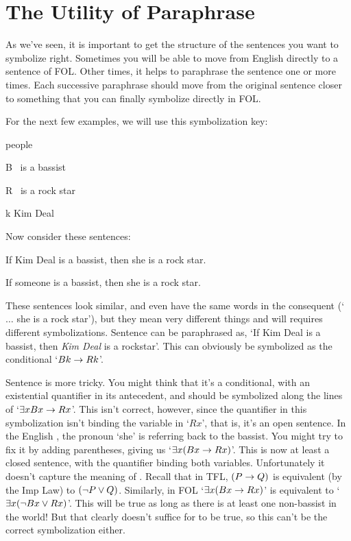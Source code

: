 \section{The Utility of Paraphrase}

As we've seen, it is important to get the structure of the sentences you want to symbolize right. Sometimes you will be able to move from English directly to a sentence of FOL. Other times, it helps to paraphrase the sentence one or more times. Each successive paraphrase should move from the original sentence closer to something that you can finally symbolize directly in FOL.

For the next few examples, we will use this symbolization key:
	\begin{ekey}
		\item[\text{domain}] people
		\item[B] \blank\ is a bassist
		\item[R] \blank\ is a rock star
		\item[k] Kim Deal
	\end{ekey}
Now consider these sentences:
	\begin{earg}
		\item[\ex{pronoun1}] If Kim Deal is a bassist, then she is a rock star.
		\item[\ex{pronoun2}] If someone is a bassist, then she is a rock star.
	\end{earg}
These sentences look similar, and even have the same words in the consequent (`$\ldots$ she is a rock star'), but they mean very different things and will requires different symbolizations. Sentence  can be paraphrased as, `If Kim Deal is a bassist, then \emph{Kim Deal} is a rockstar'. This can obviously be symbolized as the conditional `$Bk \rightarrow Rk$'.


Sentence  is more tricky.  You might think that it's a conditional, with an existential quantifier in its antecedent, and should be symbolized along the lines of `$\exists xBx \rightarrow Rx$'.  This isn't correct, however, since the quantifier in this symbolization isn't binding the variable in `$Rx$', that is, it's an open sentence.  In the English , the pronoun `she' is referring back to the bassist. You might try to fix it by adding parentheses, giving us  `$\exists x(Bx \rightarrow Rx)$'.  This is now at least a closed sentence, with the quantifier binding both variables.  Unfortunately it doesn't capture the meaning of .   Recall that in TFL, $(P \rightarrow Q)$ is equivalent (by the Imp Law) to $(\neg P \vee Q)$.  Similarly, in FOL  `$\exists x(Bx \rightarrow Rx)$' is equivalent to  `$\exists x(\neg Bx \vee Rx)$'.  This will be true as long as there is at least one non-bassist in the world! But that clearly doesn't suffice for  to be true, so this can't be the correct symbolization either.


